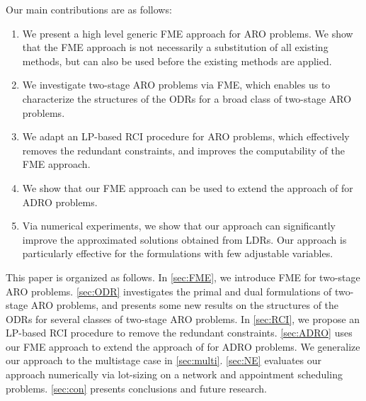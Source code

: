 \documentclass[fleqn,orsc,blindrev]{informs4}
\begin{document}
	Our main contributions are as follows:
	\begin{enumerate}
		\item  We present a high level generic FME approach for ARO problems.  {We show that the FME approach is not necessarily a substitution of all existing methods, but can also be used before the existing methods are applied.}
		\item  We investigate two-stage ARO problems via FME, which enables us to characterize the structures of the ODRs for a broad class of two-stage ARO problems. 
		\item  We adapt an LP-based RCI procedure for ARO problems, which effectively removes the redundant constraints, and improves the computability of the FME approach.
		\item  We show that our FME approach can be used to extend the approach of \cite{bsz17} for ADRO problems. 
		\item Via numerical experiments, we show that our approach can significantly improve the  {approximated solutions obtained from LDRs}. Our approach is particularly effective for the formulations with few adjustable variables.
	\end{enumerate}
	
	This paper is organized as follows. In \textsection \ref{sec:FME}, we introduce FME for two-stage ARO problems. \textsection \ref{sec:ODR} investigates the primal and dual formulations of two-stage ARO problems, and presents some new results on the structures of the ODRs for several classes of two-stage ARO problems. In \textsection \ref{sec:RCI}, we propose an LP-based RCI procedure to remove the redundant constraints.  \textsection \ref{sec:ADRO} uses our FME approach to extend the approach of \cite{bsz17} for ADRO problems. We generalize our approach to the multistage case in \textsection \ref{sec:multi}. \textsection \ref{sec:NE} evaluates our approach numerically via lot-sizing on a network and appointment scheduling problems. \textsection \ref{sec:con} presents conclusions and future research.
	
\end{document}
